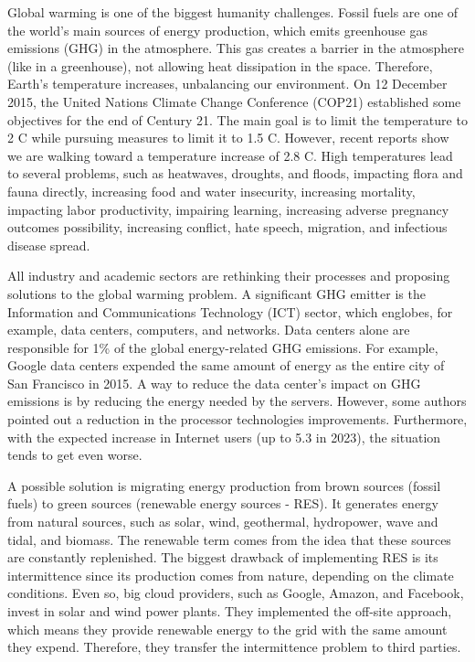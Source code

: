 Global warming is one of the biggest humanity challenges. Fossil fuels are one of the world's main sources of energy production, which emits greenhouse gas emissions (GHG) in the atmosphere. This gas creates a barrier in the atmosphere (like in a greenhouse), not allowing heat dissipation in the space. Therefore, Earth's temperature increases, unbalancing our environment. On 12 December 2015, the United Nations Climate Change Conference (COP21) established some objectives for the end of Century 21. The main goal is to limit the temperature to 2 \degree C while pursuing measures to limit it to 1.5 \degree C. However, recent reports show we are walking toward a temperature increase of 2.8 \degree C. High temperatures lead to several problems, such as heatwaves, droughts, and floods, impacting flora and fauna directly, increasing food and water insecurity, increasing mortality, impacting labor productivity, impairing learning, increasing adverse pregnancy outcomes possibility, increasing conflict, hate speech, migration, and infectious disease spread.

All industry and academic sectors are rethinking their processes and proposing solutions to the global warming problem. A significant GHG emitter is the Information and Communications Technology (ICT) sector, which englobes, for example, data centers, computers, and networks. Data centers alone are responsible for 1\% of the global energy-related GHG emissions. For example, Google data centers expended the same amount of energy as the entire city of San Francisco in 2015. A way to reduce the data center's impact on GHG emissions is by reducing the energy needed by the servers. However, some authors pointed out a reduction in the processor technologies improvements. Furthermore, with the expected increase in Internet users (up to 5.3 in 2023), the situation tends to get even worse. 

A possible solution is migrating energy production from brown sources (fossil fuels) to green sources (renewable energy sources - RES). It generates energy from natural sources, such as solar, wind, geothermal, hydropower, wave and tidal, and biomass. The renewable term comes from the idea that these sources are constantly replenished. The biggest drawback of implementing RES is its intermittence since its production comes from nature, depending on the climate conditions. Even so, big cloud providers, such as Google, Amazon, and Facebook, invest in solar and wind power plants. They implemented the off-site approach, which means they provide renewable energy to the grid with the same amount they expend. Therefore, they transfer the intermittence problem to third parties. 


